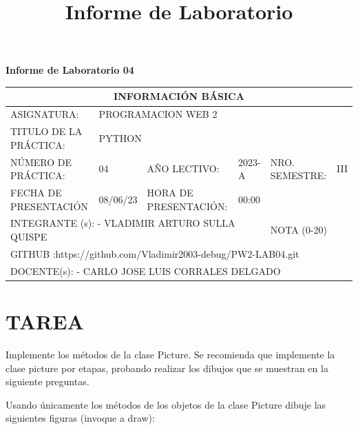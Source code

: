 \documentclass{article}
\title{Informe de Laboratorio}
\newcommand{\itemStudent}{VLADIMIR ARTURO SULLA QUISPE}
\newcommand{\itemTeacher}{CARLO JOSE LUIS CORRALES DELGADO}
\newcommand{\itemGitHubURL}{https://github.com/Vladimir2003-debug/PW2-LAB04.git}
\newcommand{\itemCourse}{PROGRAMACION WEB 2}
\newcommand{\itemSemester}{III}
\newcommand{\itemPracticeNumber}{04}
\newcommand{\itemTheme}{PYTHON}
\begin{document}
\vspace*{30px}

\begin{center}	
		\fontsize{17}{17} \textbf{ Informe de Laboratorio \itemPracticeNumber}
\end{center}
 
\renewcommand{\arraystretch}{1.5}
\begin{tabular}{ |l|l|l|l|l|l| }
    \hline
    
    \multicolumn{6}{|c|}{\cellcolor{red}INFORMACIÓN BÁSICA} \\
    \hline
    ASIGNATURA: & \multicolumn{5}{|l|}{ \itemCourse} \\
    \hline
    TITULO DE LA PRÁCTICA: & \multicolumn{5}{|l|}{\itemTheme} \\
    \hline     
    NÚMERO DE PRÁCTICA: & 04 & AÑO LECTIVO: & 2023-A & NRO. SEMESTRE: & \itemSemester\\
    \hline     
    FECHA DE PRESENTACIÓN & 08/06/23 & HORA DE PRESENTACIÓN: & \multicolumn{3}{|l|}{ 00:00 } \\
    \hline     
    \multicolumn{4}{|l|}{INTEGRANTE (s): 
    - \itemStudent 
    } &  NOTA (0-20) & \\
    \hline
    \multicolumn{6}{|l|}{GITHUB :\itemGitHubURL} \\
    \hline
    \multicolumn{6}{|l|}{DOCENTE(s): 
    - \itemTeacher 
    } \\
    \hline     
\end{tabular}

\section{TAREA}
Implemente los métodos de la clase Picture. Se recomienda que implemente la clase picture por etapas, probando realizar los dibujos que se muestran en la siguiente preguntas.

Usando únicamente los métodos de los objetos de la clase Picture dibuje las siguientes figuras (invoque a draw):
\end{document}
